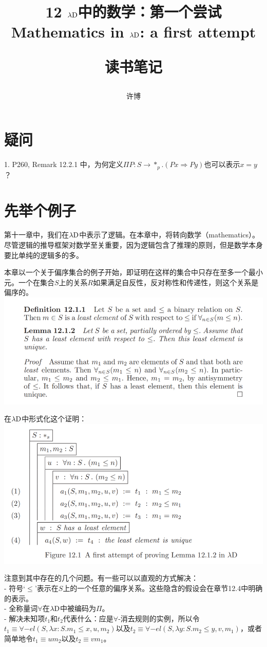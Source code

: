 \documentclass[UTF8]{article}
\title{12 $\lambda{\rm D}$中的数学：第一个尝试\\Mathematics in $\lambda{\rm D}$: a first attempt\\[2ex]\begin{large}读书笔记\end{large}}
\author{许博}
\date{}
\begin{document}
\maketitle
	\section{疑问}
		1. P260, Remark 12.2.1 中，为何定义$\Pi P:S\rightarrow*_p.(Px\Rightarrow Py)$也可以表示$x=y$？

	\section{先举个例子}
	\noindent
	第十一章中，我们在$\lambda{\rm D}$中表示了逻辑。在本章中，将转向数学（mathematics）。尽管逻辑的推导框架对数学至关重要，因为逻辑包含了推理的原则，但是数学本身要比单纯的逻辑多的多。
	
		本章以一个关于偏序集合的例子开始，即证明在这样的集合中只存在至多一个最小元。一个在集合$S$上的关系$R$如果满足自反性，反对称性和传递性，则这个关系是偏序的。\\
		\includegraphics[width=0.93\linewidth]{"../imgs/12-1.png"}
		
		在$\lambda{\rm D}$中形式化这个证明：\\
		\includegraphics[width=0.93\linewidth]{"../imgs/12-2.png"}
		
		注意到其中存在的几个问题。有一些可以以直观的方式解决：\\
		- 符号`$\le$'表示在$S$上的一个任意的偏序关系。这些隐含的假设会在章节12.4中明确的表示。\\
		- 全称量词$\forall$在$\lambda{\rm D}$中被编码为$\Pi$。\\
		- 解决未知项$t_1$和$t_2$代表什么：应是$\forall$-消去规则的实例，所以令$t_1\equiv\forall{-el}(S,\lambda x:S.m_1\le x,u,m_2)$以及$t_2\equiv\forall{-el}(S,\lambda y:S.m_2\le y,v,m_1)$，或者简单地令$t_1\equiv um_2$以及$t_2\equiv vm_1$。
		
\end{document}
